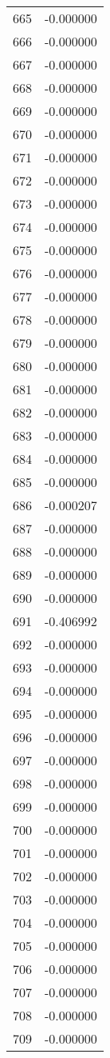 \documentclass[12pt]{article}
\begin{document}
\begin{longtable}{@{}cc@{}}
665 & -0.000000 \\
666 & -0.000000 \\
667 & -0.000000 \\
668 & -0.000000 \\
669 & -0.000000 \\
670 & -0.000000 \\
671 & -0.000000 \\
672 & -0.000000 \\
673 & -0.000000 \\
674 & -0.000000 \\
675 & -0.000000 \\
676 & -0.000000 \\
677 & -0.000000 \\
678 & -0.000000 \\
679 & -0.000000 \\
680 & -0.000000 \\
681 & -0.000000 \\
682 & -0.000000 \\
683 & -0.000000 \\
684 & -0.000000 \\
685 & -0.000000 \\
686 & -0.000207 \\
687 & -0.000000 \\
688 & -0.000000 \\
689 & -0.000000 \\
690 & -0.000000 \\
691 & -0.406992 \\
692 & -0.000000 \\
693 & -0.000000 \\
694 & -0.000000 \\
695 & -0.000000 \\
696 & -0.000000 \\
697 & -0.000000 \\
698 & -0.000000 \\
699 & -0.000000 \\
700 & -0.000000 \\
701 & -0.000000 \\
702 & -0.000000 \\
703 & -0.000000 \\
704 & -0.000000 \\
705 & -0.000000 \\
706 & -0.000000 \\
707 & -0.000000 \\
708 & -0.000000 \\
709 & -0.000000 \\

\end{longtable}
\end{document}
